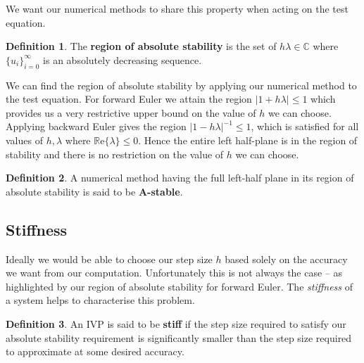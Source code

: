 \documentclass[12pt, twoside]{report}
\theoremstyle{plain}
\theoremstyle{definition}
\newtheorem{definition}{Definition}[chapter]
\theoremstyle{definition}
\providecommand{\abs}[1]{\lvert#1\rvert}
\begin{document}
            We want our numerical methods to share this property when acting 
            on the test equation.

            \begin{definition}
                The \textbf{region of absolute stability} is the set of 
                $h\lambda\in\mathbb{C}$ where 
                ${\lbrace u_i \rbrace}_{i=0}^{\infty}$ is an absolutely
                decreasing sequence.
            \end{definition}

            We can find the region of absolute stability by applying our 
            numerical method to the test equation. For forward Euler we attain 
            the region $\abs{1+h\lambda} \le 1$ which provides us a very 
            restrictive upper bound on the value of $h$ we can choose. 
            Applying backward Euler gives the region 
            $\abs{1-h\lambda}^{-1} \le 1$, which is satisfied for all values 
            of $h, \lambda$ where $\mathbb{R}\text{e}\{\lambda\} \le 0$.
            Hence the entire left half-plane is in the region of stability and 
            there is no restriction on the value of $h$ we can choose.

            \begin{definition}
                A numerical method having the full left-half plane in its 
                region of absolute stability is said to be \textbf{A-stable}.
            \end{definition} 


        \subsection{Stiffness}
        \label{2_stiffness}
            Ideally we would be able to choose our step size $h$ based solely
            on the accuracy we want from our computation. Unfortunately this is
            not always the case -- as highlighted by our region of absolute
            stability for forward Euler. The \textit{stiffness} of a system
            helps to characterise this problem.

            \begin{definition}
                An IVP is said to be \textbf{stiff} if the step size required 
                to satisfy our absolute stability requirement is significantly
                smaller than the step size required to approximate at some 
                desired accuracy.
            \end{definition}
\end{document}
